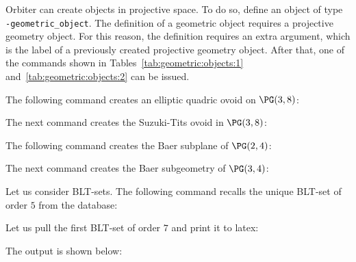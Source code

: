



Orbiter can create objects in projective space.
To do so, define an object of type
\verb'-geometric_object'.
The definition of a geometric object requires a projective geometry object. 
For this reason, the definition requires an extra argument, 
which is the label of a previously created projective geometry object.
After that, one of the commands shown in 
Tables~\ref{tab:geometric:objects:1} and~\ref{tab:geometric:objects:2} can be issued.




The following command creates an elliptic quadric ovoid on $\PG(3,8)$:


The next command creates the Suzuki-Tits ovoid in $\PG(3,8)$:





\bigskip

The following command creates the Baer subplane of $\PG(2,4)$:


The next command creates the Baer subgeometry of $\PG(3,4)$:



\bigskip

Let us consider BLT-sets. The following command recalls the unique BLT-set 
of order $5$ from the database:


Let us pull the first BLT-set of order $7$ and print it to latex:


The output is shown below:


\bigskip


